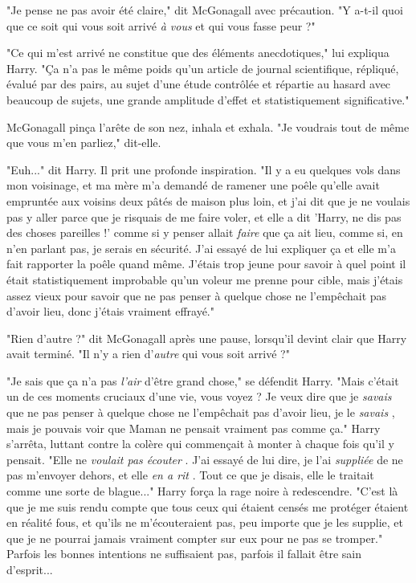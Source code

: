 "Je pense ne pas avoir été claire," dit McGonagall avec précaution. "Y a-t-il quoi que ce soit qui vous soit arrivé \emph{à vous}  et qui vous fasse peur ?"

"Ce qui m'est arrivé ne constitue que des éléments anecdotiques," lui expliqua Harry. "Ça n'a pas le même poids qu'un article de journal scientifique, répliqué, évalué par des pairs, au sujet d'une étude contrôlée et répartie au hasard avec beaucoup de sujets, une grande amplitude d'effet et statistiquement significative."

McGonagall pinça l'arête de son nez, inhala et exhala. "Je voudrais tout de même que vous m'en parliez," dit-elle.

"Euh..." dit Harry. Il prit une profonde inspiration. "Il y a eu quelques vols dans mon voisinage, et ma mère m'a demandé de ramener une poêle qu'elle avait empruntée aux voisins deux pâtés de maison plus loin, et j'ai dit que je ne voulais pas y aller parce que je risquais de me faire voler, et elle a dit 'Harry, ne dis pas des choses pareilles !' comme si y penser allait \emph{faire}  que ça ait lieu, comme si, en n'en parlant pas, je serais en sécurité. J'ai essayé de lui expliquer ça et elle m'a fait rapporter la poêle quand même. J'étais trop jeune pour savoir à quel point il était statistiquement improbable qu'un voleur me prenne pour cible, mais j'étais assez vieux pour savoir que ne pas penser à quelque chose ne l'empêchait pas d'avoir lieu, donc j'étais vraiment effrayé."

"Rien d'autre ?" dit McGonagall après une pause, lorsqu'il devint clair que Harry avait terminé. "Il n'y a rien d'\emph{autre}  qui vous soit arrivé ?"

"Je sais que ça n'a pas \emph{l'air}  d'être grand chose," se défendit Harry. "Mais c'était un de ces moments cruciaux d'une vie, vous voyez ? Je veux dire que je \emph{savais } que ne pas penser à quelque chose ne l'empêchait pas d'avoir lieu, je le \emph{savais} , mais je pouvais voir que Maman ne pensait vraiment pas comme ça." Harry s'arrêta, luttant contre la colère qui commençait à monter à chaque fois qu'il y pensait. "Elle ne \emph{voulait pas écouter} . J'ai essayé de lui dire, je l'ai \emph{suppliée}  de ne pas m'envoyer dehors, et elle \emph{en a rit} . Tout ce que je disais, elle le traitait comme une sorte de blague..." Harry força la rage noire à redescendre. "C'est là que je me suis rendu compte que tous ceux qui étaient censés me protéger étaient en réalité fous, et qu'ils ne m'écouteraient pas, peu importe que je les supplie, et que je ne pourrai jamais vraiment compter sur eux pour ne pas se tromper." Parfois les bonnes intentions ne suffisaient pas, parfois il fallait être sain d'esprit...

